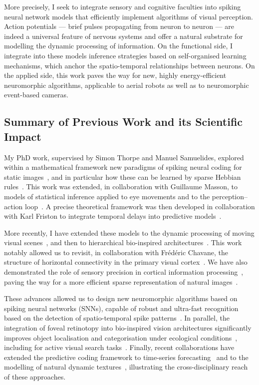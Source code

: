 \documentclass[10pt,english,a4paper,oneside]{article}%
\begin{document}
More precisely, I seek to integrate sensory and cognitive faculties into spiking neural network models that efficiently implement algorithms of visual perception. Action potentials --- brief pulses propagating from neuron to neuron --- are indeed a universal feature of nervous systems and offer a natural substrate for modelling the dynamic processing of information. On the functional side, I integrate into these models inference strategies based on self-organised learning mechanisms, which anchor the spatio-temporal relationships between neurons. On the applied side, this work paves the way for new, highly energy-efficient neuromorphic algorithms, applicable to aerial robots as well as to neuromorphic event-based cameras.

\subsection*{Summary of Previous Work and its Scientific Impact}

My PhD work, supervised by Simon Thorpe and Manuel Samuelides, explored within a mathematical framework new paradigms of spiking neural coding for static images~\citep{Perrinet03ieee}, and in particular how these can be learned by sparse Hebbian rules~\citep{Perrinet10shl}. This work was extended, in collaboration with Guillaume Masson, to models of statistical inference applied to eye movements and to the perception--action loop~\citep{Simoncini12}. A precise theoretical framework was then developed in collaboration with Karl Friston to integrate temporal delays into predictive models~\citep{PerrinetAdamsFriston14}.

More recently, I have extended these models to the dynamic processing of moving visual scenes~\citep{KhoeiMassonPerrinet17}, and then to hierarchical bio-inspired architectures~\citep{BoutinFranciosiniChavaneRuffierPerrinet20,Franciosini21}. This work notably allowed us to revisit, in collaboration with Frédéric Chavane, the structure of horizontal connectivity in the primary visual cortex~\citep{Chavane22}. We have also demonstrated the role of sensory precision in cortical information processing~\citep{Ladret23}, paving the way for a more efficient sparse representation of natural images~\citep{Ladret24sparse}.

These advances allowed us to design new neuromorphic algorithms based on spiking neural networks (SNNs), capable of robust and ultra-fast recognition based on the detection of spatio-temporal spike patterns~\citep{Grimaldi24}. In parallel, the integration of foveal retinotopy into bio-inspired vision architectures significantly improves object localisation and categorisation under ecological conditions~\citep{Jeremie25}, including for active visual search tasks~\citep{Jeremie25thesis}. Finally, recent collaborations have extended the predictive coding framework to time-series forecasting~\citep{Gunasekaran25} and to the modelling of natural dynamic textures~\citep{Meso25}, illustrating the cross-disciplinary reach of these approaches.
\end{document}
